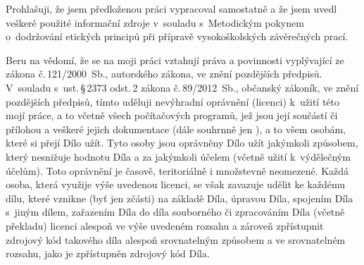 \documentclass[english,master,unicode,bw]{ctufit-thesis}
\begin{document}
\begin{declarationpage}
Prohlašuji, že jsem předloženou práci vypracoval samostatně a že jsem uvedl veškeré
použité informační zdroje v~souladu s~Metodickým pokynem o~do\-držo\-vání etických
principů při přípravě vysokoškolských závěrečných prací.

Beru na vědomí, že se na moji práci vztahují práva a povinnosti vy\-plý\-va\-jící ze zákona
č.\,121/2000~Sb., autorského zákona, ve znění pozdějších předpisů. V~souladu s~ust.\,§\,2373 odst.\,2 zákona č.\,89/2012~Sb., občanský zákoník, ve znění pozdějších předpisů,
tímto uděluji nevýhradní oprávnění (licenci) k~užití této mojí práce, a to včetně všech 
počítačových programů, jež jsou její součástí či přílohou a veškeré jejich
dokumentace (dále souhrnně jen ), a to všem osobám, které si přejí Dílo užít.
Tyto osoby jsou oprávněny Dílo užít jakýmkoli způsobem, který nesnižuje hodnotu
Díla a za jakýmkoli účelem (včetně užití k~výdělečným účelům). Toto oprávnění je
časově, teritoriálně i množstevně neomezené. Každá osoba, která využije výše
uvedenou licenci, se však zavazuje udělit ke každému dílu, které vznikne (byť jen
zčásti) na základě Díla, úpravou Díla, spojením Díla s~jiným dílem, zařazením Díla
do díla souborného či zpracováním Díla (včetně překladu) licenci alespoň ve výše
uvedeném rozsahu a zároveň zpřístupnit zdrojový kód takového díla alespoň
srovnatelným způsobem a ve srovnatelném rozsahu, jako je zpřístupněn zdrojový
kód Díla.
\end{declarationpage}

\printabstractpage %


\mainmatter\mainmatterinit %











\backmatter %

\printbibliography %

\end{document}
